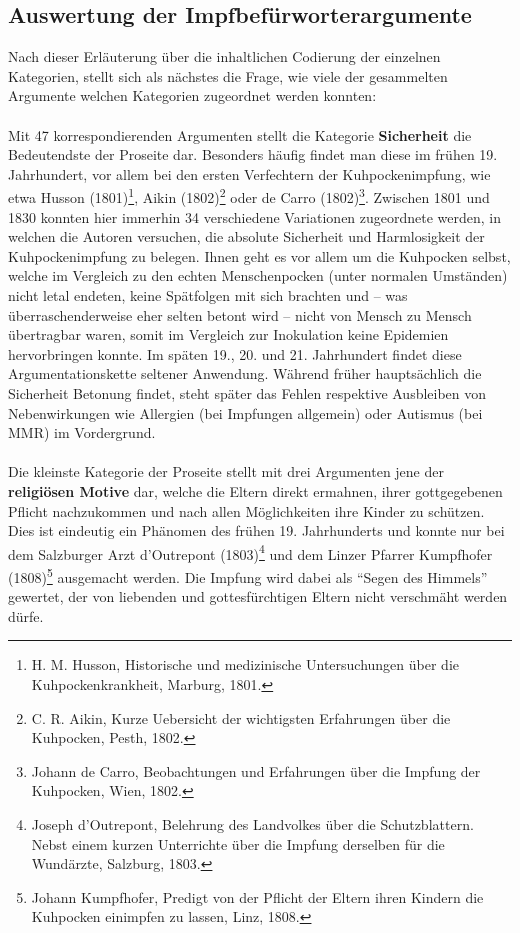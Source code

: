\documentclass[
    a4paper,
    12pt,
    hyphens,
    chapterprefix=true,
    headheight=33pt,
    footheight=29pt,
    headings=optiontohead,
]{scrartcl}
\begin{document}
{\subsection{Auswertung der Impfbefürworterargumente}
Nach dieser Erläuterung über die inhaltlichen Codierung der einzelnen Kategorien, stellt sich als nächstes die Frage, wie viele der gesammelten Argumente welchen Kategorien zugeordnet werden konnten:\\
\\
Mit 47 korrespondierenden Argumenten stellt die Kategorie \textbf{Sicherheit} die Bedeutendste der Proseite dar. Besonders häufig findet man diese im frühen 19. Jahrhundert, vor allem bei den ersten Verfechtern der Kuhpockenimpfung, wie etwa Husson (1801)\footnote{H. M. Husson, Historische und medizinische Untersuchungen über die Kuhpockenkrankheit, Marburg, 1801.}, Aikin (1802)\footnote{C. R. Aikin, Kurze Uebersicht der wichtigsten Erfahrungen über die Kuhpocken, Pesth, 1802.} oder de Carro (1802)\footnote{Johann de Carro, Beobachtungen und Erfahrungen über die Impfung der Kuhpocken, Wien, 1802.}. Zwischen 1801 und 1830 konnten hier immerhin 34 verschiedene Variationen zugeordnete werden, in welchen die Autoren versuchen, die absolute Sicherheit und Harmlosigkeit der Kuhpockenimpfung zu belegen. Ihnen geht es vor allem um die Kuhpocken selbst, welche im Vergleich zu den echten Menschenpocken (unter normalen Umständen) nicht letal endeten, keine Spätfolgen mit sich brachten und -- was überraschenderweise eher selten betont wird -- nicht von Mensch zu Mensch übertragbar waren, somit im Vergleich zur Inokulation keine Epidemien hervorbringen konnte. Im späten 19., 20. und 21. Jahrhundert findet diese Argumentationskette seltener Anwendung. Während früher hauptsächlich die Sicherheit Betonung findet, steht später das Fehlen respektive Ausbleiben von Nebenwirkungen wie Allergien (bei Impfungen allgemein) oder Autismus (bei MMR) im Vordergrund.\\
\\
Die kleinste Kategorie der Proseite stellt mit drei Argumenten jene der \textbf{religiösen Motive} dar, welche die Eltern direkt ermahnen, ihrer gottgegebenen Pflicht nachzukommen und nach allen Möglichkeiten ihre Kinder zu schützen. Dies ist eindeutig ein Phänomen des frühen 19. Jahrhunderts und konnte nur bei dem Salzburger Arzt d'Outrepont (1803)\footnote{Joseph d'Outrepont, Belehrung des Landvolkes über die Schutzblattern. Nebst einem kurzen Unterrichte über die Impfung derselben für die Wundärzte, Salzburg, 1803.} und dem Linzer Pfarrer Kumpfhofer (1808)\footnote{Johann Kumpfhofer, Predigt von der Pflicht der Eltern ihren Kindern die Kuhpocken einimpfen zu lassen, Linz, 1808.} ausgemacht werden. Die Impfung wird dabei als "`Segen des Himmels"' gewertet, der von liebenden und gottesfürchtigen Eltern nicht verschmäht werden dürfe.\\
}
\end{document}
